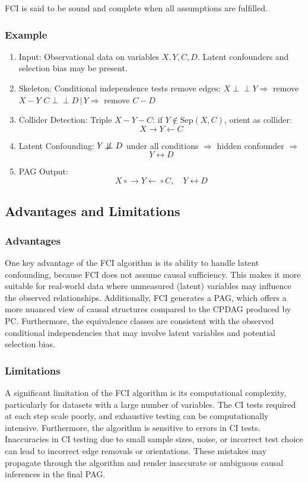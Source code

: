 \documentclass[main.tex]{subfiles}
\begin{document}
FCI is said to be sound and complete when all assumptions are fulfilled.

\subsubsection{Example}

\begin{enumerate}
  \item Input:
  Observational data on variables \( X, Y, C, D \). Latent confounders and selection bias may be present.

  \item Skeleton: 
  Conditional independence tests remove edges:  
  \( X \perp\!\!\!\perp Y \Rightarrow \) remove \( X - Y \)  
  \( C \perp\!\!\!\perp D \,|\, Y \Rightarrow \) remove \( C - D \)

  \item Collider Detection:
  Triple \( X - Y - C \): if \( Y \notin \text{Sep}(X, C) \), orient as collider:  
  \[
    X \rightarrow Y \leftarrow C
  \]

  \item Latent Confounding: 
  \( Y \not\!\perp\!\!\!\perp D \) under all conditions $\Rightarrow$ hidden confounder $\Rightarrow$
  \[
    Y \leftrightarrow D
  \]

  \item PAG Output: 
  \[
    X \circ\!\!\rightarrow Y \leftarrow\!\!\circ C,\quad Y \leftrightarrow D
  \]
\end{enumerate}




\subsection{Advantages and Limitations}
\subsubsection*{Advantages}
One key advantage of the FCI algorithm is its ability to handle latent confounding, because FCI does not assume causal sufficiency. This makes it more suitable for real-world data where unmeasured (latent) variables may influence the observed relationships. Additionally, FCI generates a PAG, which offers a more nuanced view of causal structures compared to the CPDAG produced by PC. Furthermore, the equivalence classes are consistent with the observed conditional independencies that may involve latent variables and potential selection bias.

\subsubsection*{Limitations}
A significant limitation of the FCI algorithm is its computational complexity, particularly for datasets with a large number of variables. The CI tests required at each step scale poorly, and exhaustive testing can be computationally intensive. Furthermore, the algorithm is sensitive to errors in CI tests. Inaccuracies in CI testing due to small sample sizes, noise, or incorrect test choice can lead to incorrect edge removals or orientations. These mistakes may propagate through the algorithm and render inaccurate or ambiguous causal inferences in the final PAG.
\end{document}
